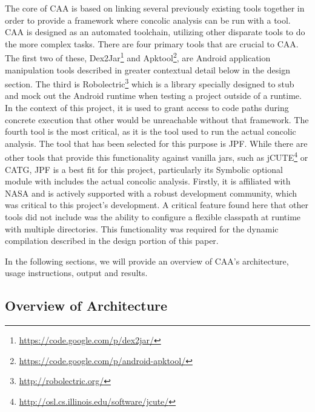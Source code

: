 \documentclass[conference]{IEEEtran}
\begin{document}
The core of CAA is based on linking several previously existing tools together in order to provide a framework where concolic analysis can be run with a tool. CAA is designed as an automated toolchain, utilizing other disparate tools to do the more complex tasks.  There are four primary tools that are crucial to CAA. The first two of these, Dex2Jar\footnote{\url{https://code.google.com/p/dex2jar/}} and Apktool\footnote{\url{https://code.google.com/p/android-apktool/}}, are Android application manipulation tools described in greater contextual detail below in the design section. The third is Robolectric\footnote{\url{http://robolectric.org/}} which is a library specially designed to stub and mock out the Android runtime when testing a project outside of a runtime.  In the context of this project, it is used to grant access to code paths during concrete execution that other would be unreachable without that framework.
The fourth tool is the most critical, as it is the tool used to run the actual concolic analysis. The tool that has been selected for this purpose is JPF.  While there are other tools that provide this functionality against vanilla jars, such as jCUTE\footnote{\url{http://osl.cs.illinois.edu/software/jcute/}} or CATG, JPF is a best fit for this project, particularly its Symbolic optional module with includes the actual concolic analysis. Firstly, it is affiliated with NASA and is actively supported with a robust development community, which was critical to this project's development. A critical feature found here that other tools did not include was the ability to configure a flexible classpath at runtime with multiple directories. This functionality was required for the dynamic compilation described in the design portion of this paper.

In the following sections, we will provide an overview of CAA's architecture, usage instructions, output and results. 

\subsection{Overview of Architecture}
\end{document}
